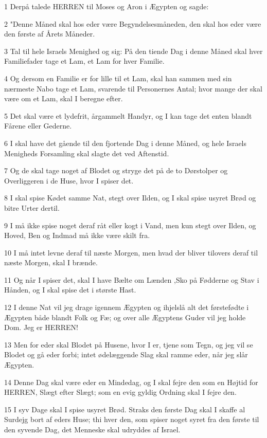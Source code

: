 \par 1 Derpå talede HERREN til Moses og Aron i Ægypten og sagde:
\par 2 "Denne Måned skal hos eder være Begyndelsesmåneden, den skal hos eder være den første af Årets Måneder.
\par 3 Tal til hele Israels Menighed og sig: På den tiende Dag i denne Måned skal hver Familiefader tage et Lam, et Lam for hver Familie.
\par 4 Og dersom en Familie er for lille til et Lam, skal han sammen med sin nærmeste Nabo tage et Lam, svarende til Personernes Antal; hvor mange der skal være om et Lam, skal I beregne efter.
\par 5 Det skal være et lydefrit, årgammelt Handyr, og I kan tage det enten blandt Fårene eller Gederne.
\par 6 I skal have det gående til den fjortende Dag i denne Måned, og hele Israels Menigheds Forsamling skal slagte det ved Aftenstid.
\par 7 Og de skal tage noget af Blodet og stryge det på de to Dørstolper og Overliggeren i de Huse, hvor I spiser det.
\par 8 I skal spise Kødet samme Nat, stegt over Ilden, og I skal spise usyret Brød og bitre Urter dertil.
\par 9 I må ikke spise noget deraf råt eller kogt i Vand, men kun stegt over Ilden, og Hoved, Ben og Indmad må ikke være skilt fra.
\par 10 I må intet levne deraf til næste Morgen, men hvad der bliver tilovers deraf til næste Morgen, skal I brænde.
\par 11 Og når I spiser det, skal I have Bælte om Lænden ,Sko på Fødderne og Stav i Hånden, og I skal spise det i største Hast.
\par 12 I denne Nat vil jeg drage igennem Ægypten og ihjelslå alt det førstefødte i Ægypten både blandt Folk og Fæ; og over alle Ægyptens Guder vil jeg holde Dom. Jeg er HERREN!
\par 13 Men for eder skal Blodet på Husene, hvor I er, tjene som Tegn, og jeg vil se Blodet og gå eder forbi; intet ødelæggende Slag skal ramme eder, når jeg slår Ægypten.
\par 14 Denne Dag skal være eder en Mindedag, og I skal fejre den som en Højtid for HERREN, Slægt efter Slægt; som en evig gyldig Ordning skal I fejre den.
\par 15 I syv Dage skal I spise usyret Brød. Straks den første Dag skal I skaffe al Surdejg bort af eders Huse; thi hver den, som spiser noget syret fra den første til den syvende Dag, det Menneske skal udryddes af Israel.
